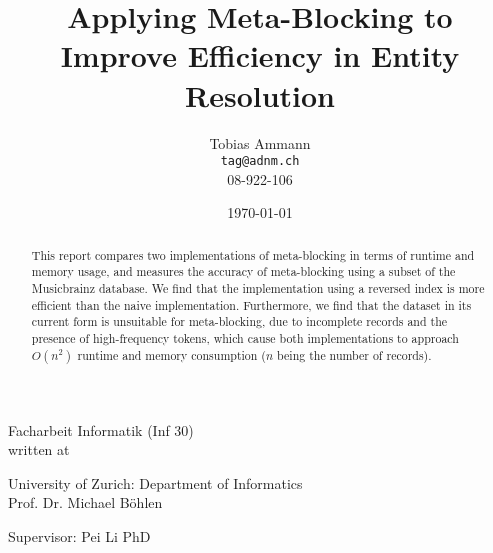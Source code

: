 \documentclass[a4paper,12pt]{article}
\begin{document}
\begin{titlepage}
\title{Applying Meta-Blocking to Improve Efficiency in Entity Resolution}


\author{
  Tobias Ammann\\
  \texttt{tag@adnm.ch}\\
  08-922-106}

\date{\today}


\maketitle

\vspace{0.5 cm}

\begin{center}
Facharbeit Informatik (Inf 30)\\

written at\\

\vspace{0.2 cm}

University of Zurich: Department of Informatics\\
Prof. Dr. Michael B\"{o}hlen\\

\vspace{0.2 cm}

Supervisor: Pei Li  PhD
\end{center}

\vspace{1.2 cm}

\begin{abstract}
This report compares two implementations of meta-blocking in terms of runtime and memory usage, and measures the accuracy of meta-blocking using a subset of the Musicbrainz database. We find that the implementation using a reversed index is more efficient than the naive implementation. Furthermore, we find that the dataset in its current form is unsuitable for meta-blocking, due to incomplete records and the presence of high-frequency tokens, which cause both implementations to approach $O(n^{2})$ runtime and memory consumption ($n$ being the number of records).
\end{abstract}

\end{titlepage}

\newpage
\tableofcontents

\newpage
\end{document}
